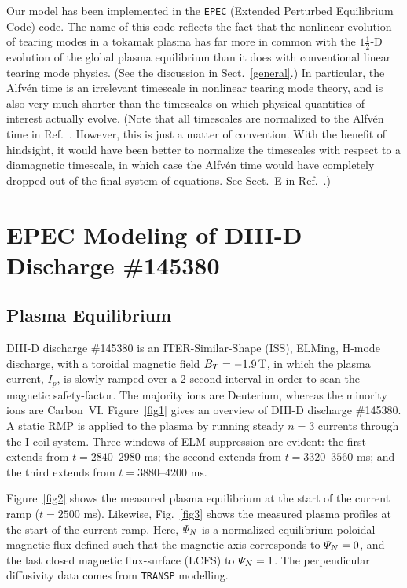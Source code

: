 \documentclass[12pt,prb,aps]{revtex4-1}
\begin{document}
Our model has been implemented in the {\tt EPEC} (Extended Perturbed Equilibrium Code) code. The name
of this code reflects the fact that the nonlinear evolution of tearing modes in a
tokamak plasma has far more in common with the $1\tfrac{1}{2}$-D
evolution of the global plasma equilibrium than it does with
conventional linear tearing mode physics. (See the discussion in Sect.~\ref{general}.) In particular, the Alfv\'{e}n time is
an irrelevant timescale in nonlinear tearing mode theory, and
is also  very much shorter than the timescales on which
physical quantities of interest actually evolve. (Note that all timescales are normalized to the Alfv\'{e}n time
in Ref.~. However, this is just a matter of convention. With the benefit of hindsight, it would
have been better to normalize the timescales with respect to a diamagnetic timescale, in which case the Alfv\'{e}n time would have completely dropped
out of the final system of equations. See Sect.~E in Ref.~.)

\section{EPEC Modeling of DIII-D Discharge \#145380}
\subsection{Plasma Equilibrium}
DIII-D discharge \#145380 is an ITER-Similar-Shape (ISS), ELMing, H-mode discharge, with a toroidal magnetic field $B_T=-1.9\,{\rm T}$, in which the
plasma current, $I_p$, is slowly ramped over a 2 second interval in order to scan the magnetic safety-factor.\cite{d3d,d3d2} The majority ions are Deuterium, whereas the
minority ions are Carbon~VI.
Figure~\ref{fig1} gives an overview of DIII-D discharge \#145380. 
A static RMP is applied to the plasma by running steady $n=3$ currents through the I-coil system.\cite{icoil}
Three windows of ELM suppression are evident: the first extends from $t=2840$--$2980$ ms; the
second extends from $t=3320$--$3560$ ms; and the third extends from $t=3880$--$4200$ ms.

Figure~\ref{fig2} shows the measured plasma equilibrium at the start of the current ramp ($t=2500$ ms). Likewise,
Fig.~\ref{fig3} shows the measured plasma profiles at the start of the current ramp. Here, ${\mit\Psi}_N$ is a
normalized equilibrium poloidal magnetic flux defined such that the magnetic axis corresponds to ${\mit\Psi}_N=0$, 
and the last closed magnetic flux-surface (LCFS) to ${\mit\Psi}_N=1$. The perpendicular
diffusivity data comes from {\tt TRANSP} modelling.\cite{transp}  
\end{document}
